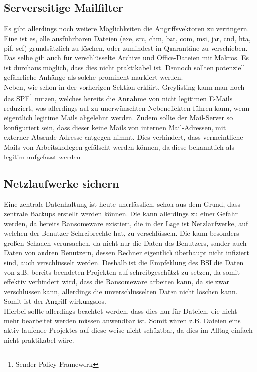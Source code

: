 \subsection{Serverseitige Mailfilter}
	Es gibt allerdings noch weitere Möglichkeiten die Angriffsvektoren zu verringern. Eine ist es, alle ausführbaren Dateien (exe, src, chm, bat, com, msi, jar, cnd, hta, pif, scf) grundsätzlich zu löschen, oder zumindest in Quarantäne zu verschieben.\cite{bsi:ransome}\\
	Das selbe gilt auch für verschlüsselte Archive und Office-Dateien mit Makros. Es ist durchaus möglich, dass dies nicht praktikabel ist. Dennoch sollten potenziell gefährliche Anhänge als solche prominent markiert werden.\cite{bsi:ransome}\\
	Neben, wie schon in der vorherigen Sektion erklärt, Greylisting kann man noch das SPF\footnote{Sender-Policy-Framework} nutzen, welches bereits die Annahme von nicht legitimen E-Mails reduziert, was allerdings auf zu unerwünschten Nebeneffekten führen kann, wenn eigentlich legitime Mails abgelehnt werden. Zudem sollte der Mail-Server so konfiguriert sein, dass dieser keine Mails von internen Mail-Adressen, mit externer Absende-Adresse entgegen nimmt.\cite{bsi:ransome} Dies verhindert, dass vermeintliche Mails von  Arbeitskollegen gefälscht werden können, da diese bekanntlich als legitim aufgefasst werden.
	
	
\subsection{Netzlaufwerke sichern}
	Eine zentrale Datenhaltung ist heute unerlässlich, schon aus dem Grund, dass zentrale Backups erstellt werden können. Die kann allerdings zu einer Gefahr werden, da bereits Ransomeware existiert, die in der Lage ist Netzlaufwerke, auf welchen der Benutzer Schreibrechte hat, zu verschlüsseln. Die kann besonders großen Schaden verursachen, da nicht nur die Daten des Benutzers, sonder auch Daten von andren Benutzern, dessen Rechner eigentlich überhaupt nicht infiziert sind, auch verschlüsselt werden. Deshalb ist die Empfehlung des BSI die Daten von z.B. bereits beendeten Projekten auf schreibgeschützt zu setzen, da somit effektiv verhindert wird, dass die Ransomeware arbeiten kann, da sie zwar verschlüssen kann, allerdings die unverschlüsselten Daten nicht löschen kann. Somit ist der Angriff wirkungslos. \cite{bsi:ransome}\\
	Hierbei sollte allerdings beachtet werden, dass dies nur für Dateien, die nicht mehr bearbeitet werden müssen anwendbar ist. Somit wären z.B. Dateien eins aktiv laufende Projektes auf diese weise nicht schüztbar, da dies im Alltag einfach nicht praktikabel wäre.
